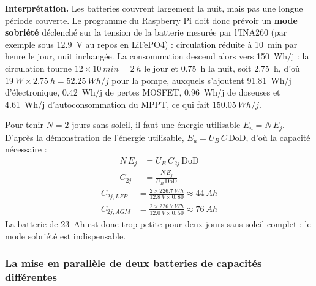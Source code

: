 \textbf{Interprétation.} Les batteries couvrent largement la nuit, mais pas une longue période couverte. Le programme du Raspberry Pi doit donc prévoir un \textbf{mode sobriété} déclenché sur la tension de la batterie mesurée par l'INA260 (par exemple sous \qty{12,9}{V} au repos en LiFePO4) : circulation réduite à \qty{10}{min} par heure le jour, nuit inchangée. La consommation descend alors vers \qty{150}{Wh/j} : la circulation tourne $12 \times \qty{10}{min} = \qty{2}{h}$ le jour et \qty{0,75}{h} la nuit, soit \qty{2,75}{h}, d'où $\qty{19}{W} \times \qty{2,75}{h} = \qty{52,25}{Wh/j}$ pour la pompe, auxquels s'ajoutent \qty{91,81}{Wh/j} d'électronique, \qty{0,42}{Wh/j} de pertes MOSFET, \qty{0,96}{Wh/j} de doseuses et \qty{4,61}{Wh/j} d'autoconsommation du MPPT, ce qui fait $\qty{150,05}{Wh/j}$.

\begin{demonstration}
Pour tenir $N = 2$ jours sans soleil, il faut une énergie utilisable $E_u = N\,E_j$. D'après la démonstration de l'énergie utilisable, $E_u = U_B\, C\,\mathrm{DoD}$, d'où la capacité nécessaire :
\begin{align*}
N\,E_j &= U_B\, C_{2j}\,\mathrm{DoD}\\
C_{2j} &= \frac{N\,E_j}{U_B\,\mathrm{DoD}}
\end{align*}
\begin{align*}
C_{2j,LFP} &= \frac{2 \times \qty{226,7}{Wh}}{\qty{12,8}{V} \times 0{,}80} \approx \qty{44}{Ah}\\
C_{2j,AGM} &= \frac{2 \times \qty{226,7}{Wh}}{\qty{12,0}{V} \times 0{,}50} \approx \qty{76}{Ah}
\end{align*}
La batterie de \qty{23}{Ah} est donc trop petite pour deux jours sans soleil complet : le mode sobriété est indispensable.
\end{demonstration}

\subsubsection*{La mise en parallèle de deux batteries de capacités différentes}


